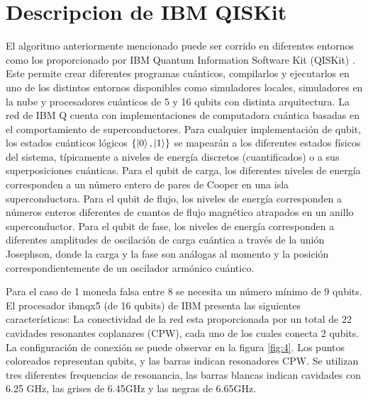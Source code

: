 \documentclass{article}
\begin{document}
\section*{ Descripcion de IBM QISKit}
El algoritmo anteriormente mencionado puede ser corrido en diferentes entornos como los proporcionado por IBM Quantum Information Software Kit (QISKit) \cite{6}.
Este permite crear diferentes programas cuánticos, compilarlos y ejecutarlos en uno de los distintos entornos disponibles como simuladores locales, simuladores en la nube y procesadores cuánticos de 5 y 16 qubits con distinta arquitectura. La red de IBM Q cuenta con implementaciones de computadora cuántica basadas en el comportamiento de superconductores. Para cualquier implementación de qubit, los estados cuánticos lógicos $\{\ket{0},\ket{1}    \}$ se mapearán a los diferentes estados físicos del sistema, típicamente a niveles de energía discretos (cuantificados) o a sus superposiciones cuánticas. Para el qubit de carga, los diferentes niveles de energía corresponden a un número entero de pares de Cooper en una isla superconductora. Para el qubit de flujo, los niveles de energía corresponden a números enteros diferentes de cuantos de flujo magnético atrapados en un anillo superconductor. Para el qubit de fase, los niveles de energía corresponden a diferentes amplitudes de oscilación de carga cuántica a través de la unión Josephson, donde la carga y la fase son análogas al momento y la posición correspondientemente de un oscilador armónico cuántico.


Para el caso de 1 moneda falsa entre 8 se necesita un número mínimo de 9 qubits. El procesador ibmqx5 (de 16 qubits) de IBM presenta las siguientes características:
La conectividad de la red esta proporcionada por un total de 22 cavidades resonantes coplanares (CPW), cada uno de los cuales conecta 2 qubits. La configuración de conexión se puede observar en la figura \ref{fig:4}. Los puntos coloreados representan qubits, y las barras indican resonadores CPW. Se utilizan tres diferentes frequencias de resonancia, las barras blancas indican cavidades con 6.25 GHz, las grises de 6.45GHz y las negras de 6.65GHz.
\end{document}
